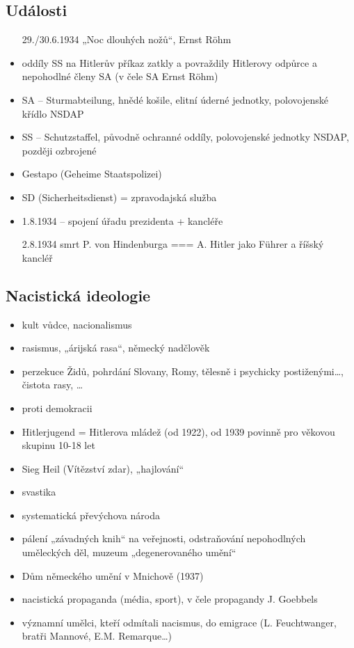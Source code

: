 \documentclass{article}
\begin{document}
\subsection*{Události}
\begin{itemize}
    \item[29./30.6.1934] „Noc dlouhých nožů“, Ernst Röhm
    \item oddíly SS na Hitlerův příkaz zatkly a povraždily Hitlerovy odpůrce a nepohodlné členy SA (v čele SA Ernst Röhm)
    \item SA – Sturmabteilung, hnědé košile, elitní úderné jednotky, polovojenské křídlo NSDAP
    \item SS – Schutzstaffel, původně ochranné oddíly, polovojenské jednotky NSDAP, později ozbrojené
    \item Gestapo (Geheime Staatspolizei)
    \item SD (Sicherheitsdienst) = zpravodajská služba
    \item 1.8.1934 – spojení úřadu prezidenta + kancléře
    \item [2.8.1934] smrt P. von Hindenburga === A. Hitler jako Führer a říšský kancléř
\end{itemize}

\subsection*{Nacistická ideologie}
\begin{itemize}
    \item kult vůdce, nacionalismus
    \item rasismus, „árijská rasa“, německý nadčlověk
    \item perzekuce Židů, pohrdání Slovany, Romy, tělesně i psychicky postiženými…, čistota rasy, …
    \item proti demokracii
    \item Hitlerjugend = Hitlerova mládež (od 1922), od 1939 povinně pro věkovou skupinu 10-18 let
    \item Sieg Heil (Vítězství zdar), „hajlování“
    \item svastika
    \item systematická převýchova národa
    \item pálení „závadných knih“ na veřejnosti, odstraňování nepohodlných uměleckých děl, muzeum „degenerovaného umění“
    \item Dům německého umění v Mnichově (1937)
    \item nacistická propaganda (média, sport), v čele propagandy J. Goebbels
    \item významní umělci, kteří odmítali nacismus, do emigrace (L. Feuchtwanger, bratři Mannové, E.M. Remarque…)
\end{itemize}
\end{document}
